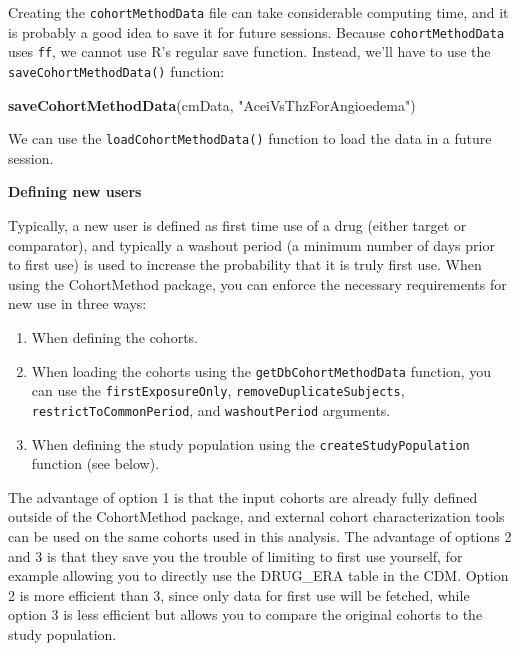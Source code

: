 \documentclass[11pt]{book}
\newenvironment{Shaded}{\begin{snugshade}}{\end{snugshade}}
\newcommand{\KeywordTok}[1]{\textcolor[rgb]{0.13,0.29,0.53}{\textbf{#1}}}
\newcommand{\NormalTok}[1]{#1}
\newcommand{\StringTok}[1]{\textcolor[rgb]{0.31,0.60,0.02}{#1}}
\providecommand{\tightlist}{%
  \setlength{\itemsep}{0pt}\setlength{\parskip}{0pt}}
\theoremstyle{definition}
\theoremstyle{definition}
\theoremstyle{definition}
\theoremstyle{remark}
\begin{document}
Creating the \texttt{cohortMethodData} file can take considerable computing time, and it is probably a good idea to save it for future sessions. Because \texttt{cohortMethodData} uses \texttt{ff}, we cannot use R's regular save function. Instead, we'll have to use the \texttt{saveCohortMethodData()} function:

\begin{Shaded}
\begin{Highlighting}[]
\KeywordTok{saveCohortMethodData}\NormalTok{(cmData, }\StringTok{"AceiVsThzForAngioedema"}\NormalTok{)}
\end{Highlighting}
\end{Shaded}

We can use the \texttt{loadCohortMethodData()} function to load the data in a future session.

\textbf{Defining new users}

Typically, a new user is defined as first time use of a drug (either target or comparator), and typically a washout period (a minimum number of days prior to first use) is used to increase the probability that it is truly first use. When using the CohortMethod package, you can enforce the necessary requirements for new use in three ways:

\begin{enumerate}
\def\labelenumi{\arabic{enumi}.}
\tightlist
\item
  When defining the cohorts.
\item
  When loading the cohorts using the \texttt{getDbCohortMethodData} function, you can use the \texttt{firstExposureOnly}, \texttt{removeDuplicateSubjects}, \texttt{restrictToCommonPeriod}, and \texttt{washoutPeriod} arguments.
\item
  When defining the study population using the \texttt{createStudyPopulation} function (see below).
\end{enumerate}

The advantage of option 1 is that the input cohorts are already fully defined outside of the CohortMethod package, and external cohort characterization tools can be used on the same cohorts used in this analysis. The advantage of options 2 and 3 is that they save you the trouble of limiting to first use yourself, for example allowing you to directly use the DRUG\_ERA table in the CDM. Option 2 is more efficient than 3, since only data for first use will be fetched, while option 3 is less efficient but allows you to compare the original cohorts to the study population.
\end{document}

